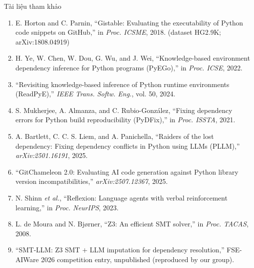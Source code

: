 \documentclass[aspectratio=169,10pt]{beamer}
\begin{document}
\begin{frame}{Tài liệu tham khảo}
\vspace{0.3em}
\scriptsize
{}
\begin{enumerate}\setlength{\itemsep}{0.22em}\setlength{\parsep}{0pt}
  \item E. Horton and C. Parnin, ``Gistable: Evaluating the executability of Python code snippets on GitHub,'' in \textit{Proc. ICSME}, 2018. {\color{gray}(dataset HG2.9K; arXiv:1808.04919)}
  \item H. Ye, W. Chen, W. Dou, G. Wu, and J. Wei, ``Knowledge-based environment dependency inference for Python programs (PyEGo),'' in \textit{Proc. ICSE}, 2022.
  \item ``Revisiting knowledge-based inference of Python runtime environments (ReadPyE),'' \textit{IEEE Trans. Softw. Eng.}, vol. 50, 2024.
  \item S. Mukherjee, A. Almanza, and C. Rubio-González, ``Fixing dependency errors for Python build reproducibility (PyDFix),'' in \textit{Proc. ISSTA}, 2021.
  \item A. Bartlett, C. C. S. Liem, and A. Panichella, ``Raiders of the lost dependency: Fixing dependency conflicts in Python using LLMs (PLLM),'' \textit{arXiv:2501.16191}, 2025.
  \item ``GitChameleon 2.0: Evaluating AI code generation against Python library version incompatibilities,'' \textit{arXiv:2507.12367}, 2025.
  \item N. Shinn \textit{et al.}, ``Reflexion: Language agents with verbal reinforcement learning,'' in \textit{Proc. NeurIPS}, 2023.
  \item L. de Moura and N. Bjørner, ``Z3: An efficient SMT solver,'' in \textit{Proc. TACAS}, 2008.
  \item ``SMT-LLM: Z3 SMT $+$ LLM imputation for dependency resolution,'' FSE-AIWare 2026 competition entry, unpublished (reproduced by our group).
\end{enumerate}
\end{frame}
\end{document}
